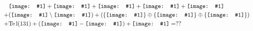 \documentclass[12pt]{article}
\newcommand{\pic}[1]{\mathord{\texttt{[image: \#1]}}}
\begin{document}
\thispagestyle{empty}
\begin{equation*}
  \begin{split}
    &\pic{"ad"} + \pic{"serg"} + \pic{"bem"} + \pic{"min"} + \pic{"iss"}\\
    +& %
    ( \pic{"E24"} \setminus \pic{"rsm"} )
    + ( \{\pic{"cws"}\} \oplus \{\pic{"as"}\} \oplus \{\pic{"caw"}\} )\\
    +& %
    \textrm{Te \!l}(131)
    +( \pic{"thol"} - \pic{"olid"} ) + \pic{"eliz"} = ??
\end{split}
\end{equation*}
\end{document}
